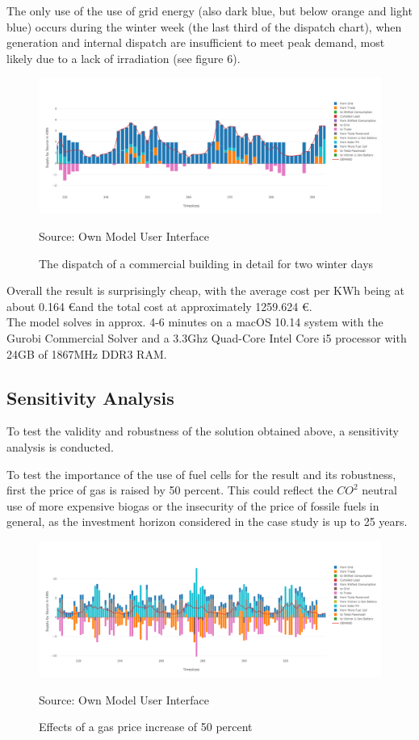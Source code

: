 \documentclass[
	11pt,								%
	DIV10,								%
	a4paper,         					%
	oneside,							%
	headheight=20pt,					%
	footheight=20pt,					%
    parskip=full,						%
    listof=totoc,						%
	bibliography=totoc,					%
	index=totoc,						%
]{scrartcl}
\begin{document}
The only use of the use of grid energy (also dark blue, but below orange and light blue) occurs during the winter week (the last third of the dispatch chart), when generation and internal dispatch are insufficient to meet peak demand, most likely due to a lack of irradiation (see figure 6).

\begin{figure}[H]
	\centering
	\includegraphics[width=1\textwidth]{pictures/COM_2_ZOOM_Base.png}
	\caption{The dispatch of a commercial building in detail for two winter days}
	\label{commercial_dispatch_base}
	\flushleft\quad\quad\footnotesize{Source: Own Model User Interface}
\end{figure}	

Overall the result is surprisingly cheap, with the average cost per KWh being at about 0.164 \euro and the total cost at approximately 1259.624 \euro.\\
The model solves in approx. 4-6 minutes on a macOS 10.14 system with the Gurobi Commercial Solver and a 3.3Ghz Quad-Core Intel Core i5 processor with 24GB of 1867MHz DDR3 RAM.

\subsection{Sensitivity Analysis}
To test the validity and robustness of the solution obtained above, a sensitivity analysis is conducted. 

To test the importance of the use of fuel cells for the result and its robustness, first the price of gas is raised by 50 percent. This could reflect the $CO^2$ neutral use of more expensive biogas or the insecurity of the price of fossile fuels in general, as the investment horizon considered in the case study is up to 25 years.
\begin{figure}[H]
	\centering
	\includegraphics[width=1\textwidth]{pictures/SCEN_1.png}
	\caption{Effects of a gas price increase of 50 percent}
	\label{commercial_dispatch_base}
	\flushleft\quad\quad\footnotesize{Source: Own Model User Interface}
\end{figure}	
\end{document}
